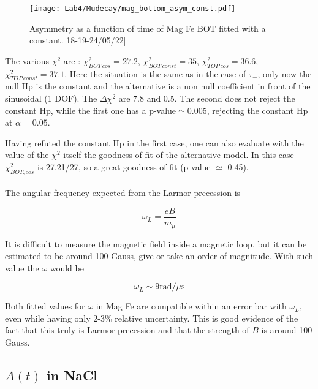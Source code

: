 \documentclass[10pt,a4paper,twocolumn]{article}
\begin{document}
\begin{figure}[h!]
\centering
\caption{Asymmetry as a function of time of Mag Fe BOT fitted with a constant. 18-19-24/05/22]}
\texttt{[image: Lab4/Mudecay/mag\_bottom\_asym\_const.pdf]} 
\label{MAG_BOT_AS_CONST}
\end{figure}

The various $\chi^2$ are : $\chi^2_{BOT \, cos} = 27.2$,  $\chi^2_{BOT \, const} = 35$, $\chi^2_{TOP \, cos} = 36.6$,  $\chi^2_{TOP \, const} = 37.1$. Here the situation is the same as in the case of $\tau_-$, only now the null Hp is the constant and the alternative is a non null coefficient in front of the sinusoidal (1 DOF). The $\Delta \chi^2$ are 7.8 and 0.5. The second does not reject the constant Hp, while the first one has a p-value$\simeq$0.005, rejecting the constant Hp at $\alpha=0.05$.

Having refuted the constant Hp in the first case, one can also evaluate with the value of the $\chi^2$ itself the goodness of fit of the alternative model. In this case $\chi^2_{BOT, cos}$ is 27.21/27, so a great goodness of fit (p-value $\simeq$ 0.45).
\\
\\
The angular frequency expected from the Larmor precession is 

\begin{equation}
    \omega_L=\frac{eB}{m_\mu}
\end{equation}

\noindent It is difficult to measure the magnetic field inside a magnetic loop, but it can be estimated to be around 100 Gauss, give or take an order of magnitude. With such value the $\omega$ would be 

\begin{equation*}
    \omega_L\sim 9 \text{rad/$\mu$s}
\end{equation*}

Both fitted values for $\omega$ in Mag Fe are compatible within an error bar with $\omega_L$, even while having only 2-3\% relative uncertainty. This is good evidence of the fact that this truly is Larmor precession and that the strength of $B$ is around 100 Gauss.  
    





\subsection{$A(t)$ in NaCl}
\end{document}
